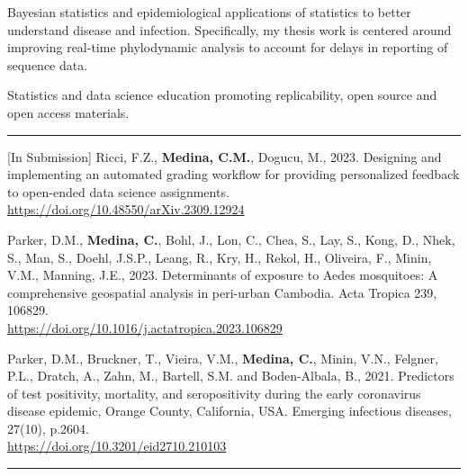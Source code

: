 \documentclass{article}
\begin{document}


\begin{description}
	\vspace{-2mm}
	\item[Research Interests]\hspace*{.1in}
		
		Bayesian statistics and epidemiological applications of statistics to better understand disease and infection. Specifically, my thesis work is centered around improving real-time phylodynamic analysis to account for delays in reporting of sequence data.
		
		Statistics and data science education promoting replicability, open source and open access materials.
		
\end{description}
\vspace{-2mm}
\rule{\linewidth}{1pt}




\begin{description}
	\vspace{-2mm}
	\item[Publications]\hspace*{.1in} 
	
		[In Submission] Ricci, F.Z., \textbf{Medina, C.M.}, Dogucu, M., 2023. Designing and implementing an automated grading workflow for providing personalized feedback to open-ended data science assignments.\\  \url{https://doi.org/10.48550/arXiv.2309.12924}
		
		Parker, D.M., \textbf{Medina, C.}, Bohl, J., Lon, C., Chea, S., Lay, S., Kong, D., Nhek, S., Man, S., Doehl, J.S.P., Leang, R., Kry, H., Rekol, H., Oliveira, F., Minin, V.M., Manning, J.E., 2023. Determinants of exposure to Aedes mosquitoes: A comprehensive geospatial analysis in peri-urban Cambodia. Acta Tropica 239, 106829.\\ 
		\url{https://doi.org/10.1016/j.actatropica.2023.106829}
		
		Parker, D.M., Bruckner, T., Vieira, V.M., \textbf{Medina, C.}, Minin, V.N., Felgner, P.L., Dratch, A., Zahn, M., Bartell, S.M. and Boden-Albala, B., 2021. Predictors of test positivity, mortality, and seropositivity during the early coronavirus disease epidemic, Orange County, California, USA. Emerging infectious diseases, 27(10), p.2604.\\ \url{https://doi.org/10.3201/eid2710.210103}

\end{description}
\vspace{-2mm}
\rule{\linewidth}{1pt}
\end{document}
